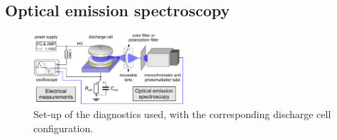 \documentclass[a4paper,10pt,twoside]{article}
\begin{document}
		\subsection{Optical emission spectroscopy}\label{subsec:oes}
		
				\begin{figure}[b!]
					\centering
					\hspace{0.5cm}\includegraphics[width=0.5\textwidth]{figures/setup/setup.pdf}
					\caption{Set-up of the diagnostics used, with the corresponding discharge cell configuration.}
					\label{img:diag}
				\end{figure}
		
\end{document}
